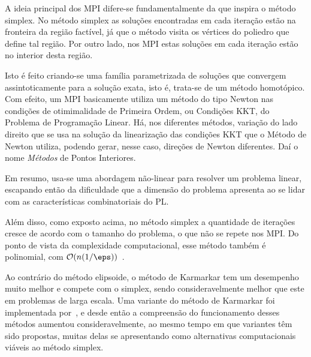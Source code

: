 


A ideia principal dos \ac{MPI} difere-se fundamentalmente da que inspira o
método simplex. No método simplex as soluções encontradas em cada iteração estão
na fronteira da região factível, já que o método visita os vértices do poliedro
que define tal região. Por outro lado, nos \ac{MPI} estas soluções em cada
iteração estão no interior desta região. 

Isto é feito criando-se uma família
parametrizada de soluções que convergem assintoticamente para a solução exata,
isto é, trata-se de um método homotópico. Com efeito, um \ac{MPI} basicamente utiliza um método do tipo Newton nas condições de otimimalidade de Primeira Ordem, ou Condições KKT, do Problema de Programação Linear. Há, nos diferentes métodos, variação  do lado direito que se usa na solução da linearização das condições KKT que o Método de Newton utiliza, podendo gerar, nesse caso,  direções de Newton diferentes. Daí o nome \emph{Métodos} de Pontos Interiores. 

Em resumo, usa-se uma abordagem não-linear para resolver um problema
linear, escapando então da  dificuldade que a dimensão do problema apresenta ao
se lidar com as características combinatoriais  do \ac{PL}.


Além disso,  como exposto acima,  no método simplex a quantidade de
iterações cresce de acordo com o tamanho do problema,  o que não se repete
nos \ac{MPI}. Do ponto de vista
da complexidade computacional, esse método também é polinomial,  com
$\mathcal{O}(n(1/\eps))$~\cite{Karmarkar:1984cp}.
 
  
Ao contrário do método elipsoide, o método de Karmarkar tem um desempenho muito
melhor e compete com o simplex, sendo consideravelmente melhor  que este em
problemas de larga escala. Uma variante do método de Karmarkar foi implementada
por~\textcite{Adler:1989fw}, e desde então a compreensão do funcionamento desses
métodos aumentou consideravelmente, ao mesmo tempo em que variantes têm
sido propostas, muitas delas se apresentando como alternativas computacionais
viáveis ao método simplex.

